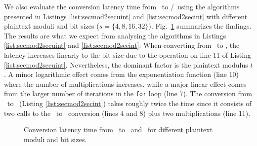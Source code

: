 We also evaluate the conversion latency time from \secmod\ to \secuint/\secint\ using the algorithms presented in Listings \ref{list:secmod2secuint} and \ref{list:secmod2secint} with different plaintext moduli and bit sizes ($s = \{4, 8, 16, 32\}$). Fig.~\ref{fig:fromsecmod} summarizes the findings.
The results are what we expect from analysing the algorithms in Listings \ref{list:secmod2secuint} and \ref{list:secmod2secint}: When converting from \secmod\ to \secuint, the latency increases linearly to the bit size due to the operation on line 11 of Listing \ref{list:secmod2secuint}. Nevertheless, the dominant factor is the plaintext modulus $t$. A minor logarithmic effect comes from the exponentiation function (line 10) where the number of multiplications increases, while a major linear effect comes from the larger number of iterations in the \texttt{for} loop (line 7).
The conversion from \secmod\ to \secint\ (Listing \ref{list:secmod2secint}) takes roughly twice the time since it consists of two calls to the \secmod\ to \secuint\ conversion (lines 4 and 8) plus two multiplications (line 11).

\begin{figure}[t]
	\centering
	\caption{Conversion latency time from \secmod\ to \secuint\ and \secint\ for different plaintext moduli and bit sizes.}
	\label{fig:fromsecmod}
	\vspace{-0.5cm}
\end{figure}




